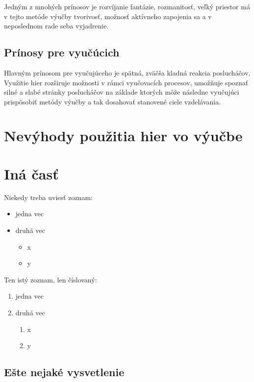 \documentclass[10pt,twoside,slovak,a4paper]{article}
\begin{document}
Jedným z mnohých prínosov je rozvíjanie fantázie, rozmanitosť, veľký priestor má v tejto metóde výučby tvorivosť, možnosť aktívneho zapojenia sa a v neposlednom rade seba vyjadrenie.

\subsection{Prínosy pre vyučúcich}

Hlavným prínosom pre vyučujúceho je spätná, zväčša kladná reakcia poslucháčov. Využitie hier rozširuje možnosti v rámci vyučovacích procesov, umožňuje spoznať silné a slabé stránky poslucháčov na základe ktorých môže následne vyučujúci prispôsobiť metódy výučby a tak dosahovať stanovené ciele vzdelávania.

\section{Nevýhody použitia hier vo výučbe}

\section{Iná časť}



Niekedy treba uviesť zoznam:

\begin{itemize}
\item jedna vec
\item druhá vec
	\begin{itemize}
	\item x
	\item y
	\end{itemize}
\end{itemize}

Ten istý zoznam, len číslovaný:

\begin{enumerate}
\item jedna vec
\item druhá vec
	\begin{enumerate}
	\item x
	\item y
	\end{enumerate}
\end{enumerate}


\subsection{Ešte nejaké vysvetlenie} \label{ina:este}
\end{document}
